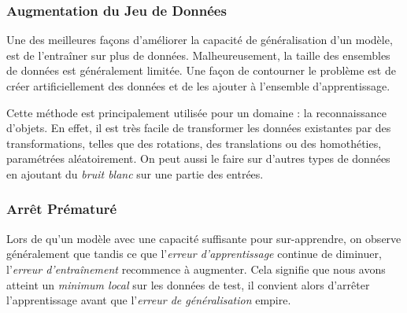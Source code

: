 \documentclass[a4paper, 10pt]{report}
\begin{document}
\subsubsection{Augmentation du Jeu de Données}
Une des meilleures façons d'améliorer la capacité de généralisation d'un modèle, est de l'entraîner sur plus de données.
Malheureusement, la taille des ensembles de données est généralement limitée.
Une façon de contourner le problème est de créer artificiellement des données et de les ajouter à l'ensemble d'apprentissage.

Cette méthode est principalement utilisée pour un domaine : la reconnaissance d'objets.
En effet, il est très facile de transformer les données existantes par des transformations, telles que des rotations, des translations ou des homothéties, paramétrées aléatoirement.
On peut aussi le faire sur d'autres types de données en ajoutant du \emph{bruit blanc} sur une partie des entrées.
\subsubsection{Arrêt Prématuré}
Lors de qu'un modèle avec une capacité suffisante pour sur-apprendre, on observe généralement que tandis ce que l'\emph{erreur d'apprentissage} continue de diminuer, l'\emph{erreur d'entraînement} recommence à augmenter.
Cela signifie que nous avons atteint un \emph{minimum local} sur les données de test, il convient alors d'arrêter l'apprentissage avant que l'\emph{erreur de généralisation} empire.
\end{document}
